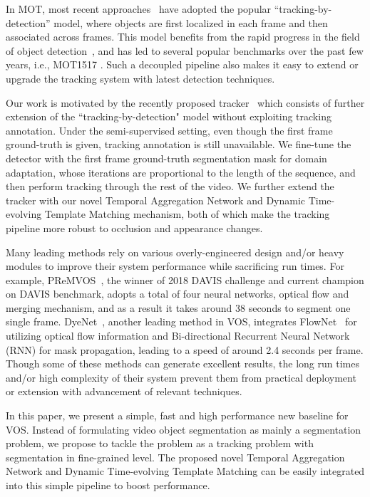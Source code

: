 \documentclass[10pt,twocolumn,letterpaper]{article}
\begin{document}
In MOT, most recent approaches~\cite{xiang2015learning, leal2016learning,  sadeghian2017tracking, chu2017online, sadeghian2017tracking, chu2017online, bochinski2017high, zhu2018online, xu2019spatial, bergmann2019tracking} have adopted the popular “tracking-by-detection” model, where objects are first localized in each frame and then associated across frames.
This model benefits from the rapid progress in the field of object detection~\cite{ross2010dpm, ren2015faster, he2017mask, lin2017feature, lin2017focal, dai2017deformable, cai2018cascade}, and has led to several popular benchmarks over the past few years, i.e., MOT1517 \cite{MOTChallenge2015, MOT16}.
Such a decoupled pipeline also makes it easy to extend or upgrade the tracking system with latest detection techniques.


Our work is motivated by the recently proposed tracker~\cite{bergmann2019tracking}
which consists of further extension of the ``tracking-by-detection" model without exploiting tracking annotation.
Under the semi-supervised setting, even though the first frame ground-truth is given, tracking annotation is still unavailable.
We fine-tune the detector with the first frame ground-truth segmentation mask for domain adaptation, whose iterations are proportional to the length of the sequence, and then perform tracking through the rest of the video.
We further extend the tracker with our novel Temporal Aggregation Network and Dynamic Time-evolving Template Matching mechanism, both of which make the tracking pipeline more robust to occlusion and appearance changes.


Many leading methods rely on various overly-engineered design and/or heavy modules to improve their system performance while sacrificing run times.
For example, PReMVOS~\cite{luiten2018premvos}, the winner of 2018 DAVIS challenge and current champion on DAVIS benchmark, adopts a total of four neural networks, optical flow and merging mechanism, and as a result it takes around 38 seconds to segment one single frame.
DyeNet~\cite{xiao2018jointreid}, another leading method in VOS, integrates FlowNet~\cite{flownet2} for utilizing optical flow information and Bi-directional Recurrent Neural Network (RNN) for mask propagation, leading to a speed of around 2.4 seconds per frame.
Though some of these methods can generate excellent results, the long run times and/or high complexity of their system  prevent them from practical deployment or extension with advancement of relevant techniques.

In this paper, we present a simple, fast and high performance new baseline for VOS.
Instead of formulating video object segmentation as mainly a segmentation problem, we propose to tackle the problem as a tracking problem with segmentation in fine-grained level.
The proposed novel Temporal Aggregation Network and Dynamic Time-evolving Template Matching can be easily integrated into this simple pipeline to  boost  performance.
\end{document}
